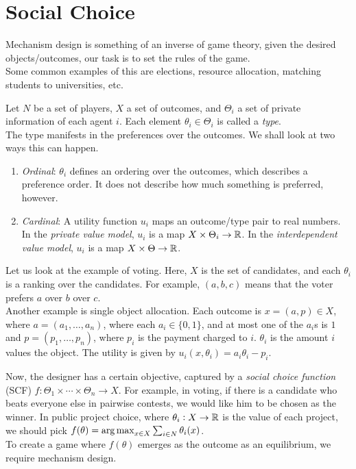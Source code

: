 \section{Social Choice}

Mechanism design is something of an inverse of game theory, given the desired objects/outcomes, our task is to set the rules of the game.\\
Some common examples of this are elections, resource allocation, matching students to universities, etc.

Let $N$ be a set of players, $X$ a set of outcomes, and $\Theta_i$ a set of private information of each agent $i$. Each element $\theta_i \in \Theta_i$ is called a \emph{type}.\\

The type manifests in the preferences over the outcomes. We shall look at two ways this can happen.
\begin{enumerate}
 	\item \emph{Ordinal}: $\theta_i$ defines an ordering over the outcomes, which describes a preference order. It does not describe how much something is preferred, however.
 	\item \emph{Cardinal}: A utility function $u_i$ maps an outcome/type pair to real numbers. In the \emph{private value model}, $u_i$ is a map $X \times \Theta_i \to \mathbb{R}$. In the \emph{interdependent value model}, $u_i$ is a map $X \times \Theta \to \mathbb{R}$.
\end{enumerate}

\begin{fex}
	Let us look at the example of voting. Here, $X$ is the set of candidates, and each $\theta_i$ is a ranking over the candidates. For example, $(a,b,c)$ means that the voter prefers $a$ over $b$ over $c$. \\
	Another example is single object allocation. Each outcome is $x = (a,p) \in X$, where $a = (a_1,\ldots,a_n)$, where each $a_i \in \{0,1\}$, and at most one of the $a_i$s is $1$ and $p = (p_1,\ldots,p_n)$, where $p_i$ is the payment charged to $i$. $\theta_i$ is the amount $i$ values the object. The utility is given by $u_i(x,\theta_i) = a_i\theta_i - p_i$.
\end{fex}

Now, the designer has a certain objective, captured by a \emph{social choice function} (SCF) $f : \Theta_1 \times \cdots \times \Theta_n \to X$. For example, in voting, if there is a candidate who beats everyone else in pairwise contests, we would like him to be chosen as the winner. In public project choice, where $\theta_i : X \to \mathbb{R}$ is the value of each project, we should pick $f(\theta) = \operatorname*{arg\,max}_{x \in X} \sum_{i \in N} \theta_i(x)$.\\
To create a game where $f(\theta)$ emerges as the outcome as an equilibrium, we require mechanism design.


